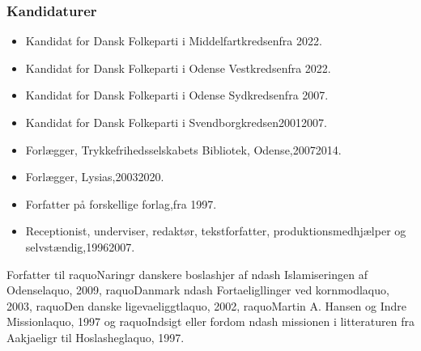 \documentclass[11pt, a4paper]{awesome-cv}
\begin{document}
\begin{cvletter}
\subsubsection*{Kandidaturer}
\begin{itemize}
\item Kandidat for Dansk Folkeparti i Middelfartkredsenfra 2022.
\item Kandidat for Dansk Folkeparti i Odense Vestkredsenfra 2022.
\item Kandidat for Dansk Folkeparti i Odense Sydkredsenfra 2007.
\item Kandidat for Dansk Folkeparti i Svendborgkredsen20012007.
\end{itemize}
\begin{itemize}
\item Forlægger, Trykkefrihedsselskabets Bibliotek, Odense,20072014.
\item Forlægger, Lysias,20032020.
\item Forfatter på forskellige forlag,fra 1997.
\item Receptionist, underviser, redaktør, tekstforfatter, produktionsmedhjælper og selvstændig,19962007.
\end{itemize}
Forfatter til raquoNaringr danskere boslashjer af ndash Islamiseringen af Odenselaquo, 2009, raquoDanmark ndash Fortaeligllinger ved kornmodlaquo, 2003, raquoDen danske ligevaeliggtlaquo, 2002, raquoMartin A. Hansen og Indre Missionlaquo, 1997 og raquoIndsigt eller fordom ndash missionen i litteraturen fra Aakjaeligr til Hoslasheglaquo, 1997.

\end{cvletter}
\end{document}
